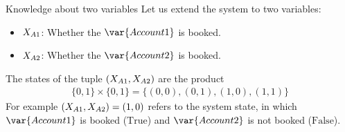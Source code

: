 \documentclass{beamer}
\begin{document}
    \begin{frame}{Knowledge about two variables}
        Let us extend the system to two variables:
        \begin{itemize}
            \item $X_{A1}$: Whether the $\var{Account 1}$ is booked.
            \item $X_{A2}$: Whether the $\var{Account 2}$ is booked.
        \end{itemize}
        The states of the tuple $(X_{A1},X_{A2})$ are the product
        \begin{align*}
            \{0,1\} \times \{0,1\} = \{(0,0),(0,1),(1,0),(1,1)\}
        \end{align*}
        For example $(X_{A1},X_{A2})=(1,0)$ refers to the system state, in which $\var{Account 1}$ is booked ($\mathrm{True}$) and $\var{Account 2}$ is not booked ($\mathrm{False}$).

        \begin{center}
        \end{center}

    \end{frame}
\end{document}
